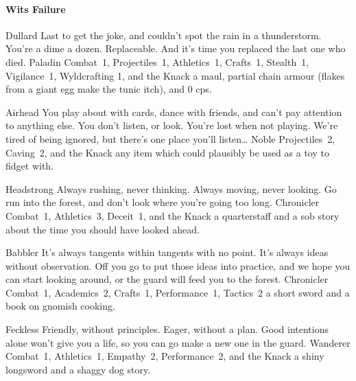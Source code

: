 \begin{multicols}{2}
\begin{itemize}
\end{itemize}

\paragraph{Wits Failure}
\begin{itemize}

  {Dullard}%
  {%
    Last to get the joke, and couldn't spot the rain in a thunderstorm.
    You're a dime a dozen.
    Replaceable.
    And it's time you replaced the last one who died.
  }%
  {Paladin}%
  {Combat~1, Projectiles~1, Athletics~1, Crafts~1, Stealth~1, Vigilance~1, Wyldcrafting 1, and the Knack \lucky}%
  {a maul, partial chain armour (flakes from a giant egg make the tunic itch), and 0 \glspl{cp}.}%

  {Airhead}%
  {You play about with cards, dance with friends, and can't pay attention to anything else.
  You don't listen, or look.
  You're lost when not playing.
  We're tired of being ignored, but there's one place you'll listen\ldots
  }%
  {Noble}%
  {Projectiles~2, Caving~2, and the Knack \unstoppable}%
  {any item which could plausibly be used as a toy to fidget with.}%

  {Headstrong}%
  {Always rushing, never thinking.
  Always moving, never looking.
  Go run into the forest, and don't look where you're going too long.
  }%
  {Chronicler}%
  {Combat~1, Athletics~3, Deceit~1, and the Knack \charge}%
  {a quarterstaff and a sob story about the time you should have looked ahead.}%

  {Babbler}%
  {It's always tangents within tangents with no point.
  It's always ideas without observation.
  Off you go to put those ideas into practice, and we hope you can start looking around, or the \gls{guard} will feed you to the forest.
  }%
  {Chronicler}%
  {Combat~1, Academics~2, Crafts~1, Performance~1, Tactics~2}%
  {a short sword and a book on gnomish cooking.}%

  {Feckless}%
  {Friendly, without principles.
  Eager, without a plan.
  Good intentions alone won't give you a life, so you can go make a new one in the \gls{guard}.
  }%
  {Wanderer}%
  {Combat~1, Athletics~1, Empathy~2, Performance~2, and the Knack \fasthealer}%
  {a shiny longsword and a shaggy dog story.}%


\end{itemize}
\end{multicols}

